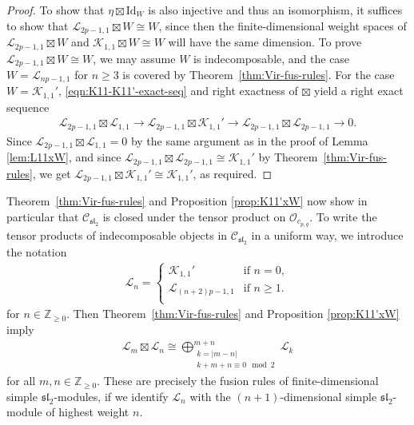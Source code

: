 \documentclass[pdftex]{sigma}
\numberwithin{equation}{section}
\theoremstyle{definition}
\begin{document}
\begin{proof}
To show that $\eta\boxtimes\mathrm{Id}_W$ is also injective and thus an isomorphism, it suffices to show that $\mathcal{L}_{2p-1,1}\boxtimes W\cong W$, since then the finite-dimensional weight spaces of $\mathcal{L}_{2p-1,1}\boxtimes W$ and $\mathcal{K}_{1,1}\boxtimes W\cong W$ will have the same dimension. To prove $\mathcal{L}_{2p-1,1}\boxtimes W\cong W$, we may assume $W$ is indecomposable, and the case $W=\mathcal{L}_{np-1,1}$ for $n\geq 3$ is covered by Theorem~\ref{thm:Vir-fus-rules}. For the case~${W=\mathcal{K}_{1,1}'}$, \eqref{eqn:K11-K11'-exact-seq} and right exactness of $\boxtimes$ yield a right exact sequence
\begin{gather*}
\mathcal{L}_{2p-1,1}\boxtimes\mathcal{L}_{1,1}\longrightarrow\mathcal{L}_{2p-1,1}\boxtimes\mathcal{K}_{1,1}'\longrightarrow\mathcal{L}_{2p-1,1}\boxtimes\mathcal{L}_{2p-1,1}\longrightarrow 0.
\end{gather*}
Since $\mathcal{L}_{2p-1,1}\boxtimes\mathcal{L}_{1,1}=0$ by the same argument as in the proof of Lemma \ref{lem:L11xW}, and since $\mathcal{L}_{2p-1,1}\boxtimes\mathcal{L}_{2p-1,1}\cong\mathcal{K}_{1,1}'$ by Theorem~\ref{thm:Vir-fus-rules}, we get $\mathcal{L}_{2p-1,1}\boxtimes\mathcal{K}_{1,1}'\cong\mathcal{K}_{1,1}'$, as required.
\end{proof}



Theorem~\ref{thm:Vir-fus-rules} and Proposition \ref{prop:K11'xW} now show in particular that $\mathcal{C}_{\mathfrak{sl}_2}$ is closed under the tensor product on $\mathcal{O}_{c_{p,q}}$.
To write the tensor products of indecomposable objects in $\mathcal{C}_{\mathfrak{sl}_2}$ in a uniform way, we introduce the notation
\begin{gather}\label{eqn:Ln-notation}
\mathcal{L}_n =\begin{cases}
\mathcal{K}_{1,1}' & \text{if } n=0,\\
\mathcal{L}_{(n+2)p-1,1} & \text{if } n\geq 1.\\
\end{cases}
\end{gather}
for $n\in\mathbb{Z}_{\geq 0}$. Then Theorem~\ref{thm:Vir-fus-rules} and Proposition \ref{prop:K11'xW} imply
\begin{gather}\label{eqn:unif-fus-rules}
\mathcal{L}_m\boxtimes\mathcal{L}_n\cong\bigoplus_{\substack{k=\vert m-n\vert\\
k+m+n\equiv 0 \mod 2}}^{m+n} \mathcal{L}_k
\end{gather}
for all $m,n\in\mathbb{Z}_{\geq 0}$. These are precisely the fusion rules of finite-dimensional simple $\mathfrak{sl}_2$-modules, if we identify $\mathcal{L}_n$ with the $(n+1)$-dimensional simple $\mathfrak{sl}_2$-module of highest weight $n$.
\end{document}

